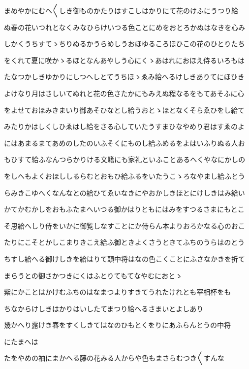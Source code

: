 \documentclass[a4paper,11pt,landscape]{ltjtarticle}
\begin{document}
まめやかにむへ〱しき御ものかたりはすこしはかりにて花のけふにうつり給
\par\medskip
ぬ春の花いつれとなくみなひらけいつる色ことにめをおとろかぬはなきを心み
\par\medskip
しかくうちすてゝちりぬるかうらめしうおほゆるころほひこの花のひとりたち
\par\medskip
をくれて夏に咲かゝるほとなんあやしう心にくゝあはれにおほえ侍るいろもは
\par\medskip
たなつかしきゆかりにしつへしとてうちほゝゑみ給へるけしきありてにほひき
\par\medskip
よけなり月はさしいてぬれと花の色さたかにもみえぬ程なるをもてあそふに心
\par\medskip
をよせておほみきまいり御あそひなとし給うおとゝほとなくそらゑひをし給て
\par\medskip
みたりかはしくしひゑはし給をさる心していたうすまひなやめり君はすゑのよ
\par\medskip
にはあまるまてあめのしたのいふそくにものし給ふめるをよはいふりぬる人お
\par\medskip
もひすて給ふなんつらかりける文籍にも家礼といふことあるへくやなにかしの
\par\medskip
をしへもよくおほししるらむとおもひ給ふるをいたうこゝろなやまし給ふとう
\par\medskip
らみきこゆへくなんなとの給ひてゑいなきにやおかしきほとにけしきはみ給い
\par\medskip
かてかむかしをおもふたまへいつる御かはりともにはみをすつるさまにもとこ
\par\medskip
そ思給へしり侍をいかに御覧しなすことにか侍らん本よりおろかなる心のおこ
\par\medskip
たりにこそとかしこまりきこえ給ふ御ときよくさうときてふちのうらはのとう
\par\medskip
ちすし給へる御けしきを給はりて頭中将はなの色こくことにふさなかきを折て
\par\medskip
まらうとの御さかつきにくはふとりてもてなやむにおとゝ
\par\medskip
紫にかことはかけむふちのはなまつよりすきてうれたけれとも宰相杯をも
\par\medskip
ちなからけしきはかりはいしたてまつり給へるさまいとよしあり
\par\medskip
幾かへり露けき春をすくしきてはなのひもとくをりにあふらんとうの中将
\par\medskip
にたまへは
\par\medskip
たをやめの袖にまかへる藤の花みる人からや色もまさらむつき〱すんな
\par\medskip
\end{document}
